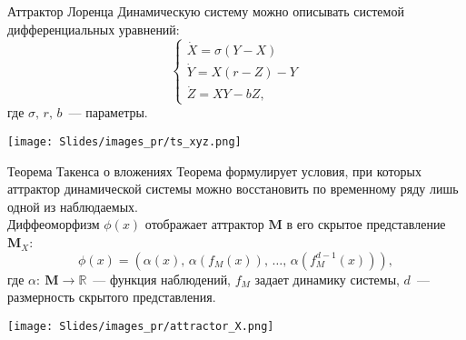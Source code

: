 \documentclass[9pt]{beamer}
\newcommand{\bM}{\mathbf{M}}
\begin{document}
\begin{frame}{Аттрактор Лоренца}
Динамическую систему можно описывать системой дифференциальных уравнений:
$$
    \begin{cases}
        \dot X = \sigma(Y -X)\\
        \dot Y = X(r - Z) - Y\\
        \dot Z = XY - bZ,
    \end{cases}
$$
где $\sigma, \, r,\, b$~--- параметры.

\vspace{0.3cm}
\texttt{[image: Slides/images\_pr/ts\_xyz.png]}

\end{frame}
\begin{frame}{Теорема Такенса о вложениях}
\vspace{0.2cm}
Теорема формулирует условия, при которых аттрактор динамической системы можно восстановить по временному ряду лишь одной из наблюдаемых.\\
Диффеоморфизм $\phi(x)$ отображает аттрактор $\bM$ в его скрытое представление~$\bM_X$:
\[ \phi(x) = (\alpha(x),\, \alpha(f_M(x)),\, \dots,\, \alpha(f_M^{d-1}(x))),\]
где $\alpha:\: \bM\rightarrow \mathbb{R}$~--- функция наблюдений, $f_M$ задает динамику системы, $d$~--- размерность скрытого представления.

\vspace{0.2cm}
\texttt{[image: Slides/images\_pr/attractor\_X.png]}

\end{frame}
\end{document}
